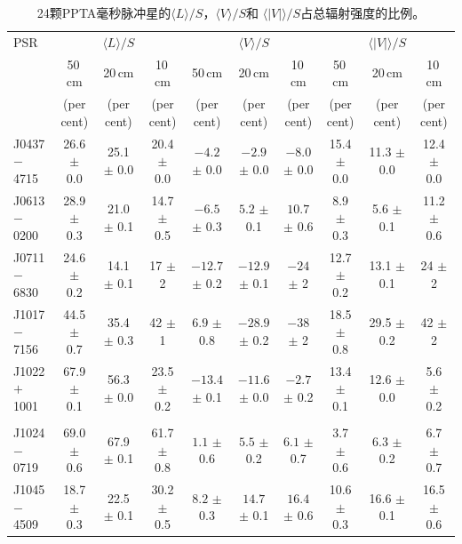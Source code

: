 %
\begin{landscape}
\begin{table}
\small
\begin{center}
\caption{24颗PPTA毫秒脉冲星的$\langle L \rangle/S$，$\langle V \rangle/S$和 
$\langle|V|\rangle/S$占总辐射强度的比例。}
\label{tablePol}
\begin{tabular}{lccccccccc}
\hline
PSR              &                  &    $\langle L \rangle/S$    &                  &               & $\langle V \rangle/S$       &                  &      &      $\langle|V|\rangle/S$       &                      \\
								 &    50\,cm      &   20\,cm       &    10\,cm &    50\,cm      &   20\,cm       &    10\,cm &    50\,cm      &   20\,cm       &    10\,cm              \\
								 &     (per cent)   &         (per cent)          &     (per cent)   &    (per cent)   &         (per cent)          &     (per cent)   &   (per cent)   &         (per cent)          &     (per cent)  \\
\hline
J0437$-$4715& 26.6 $\pm$ 0.0& 25.1 $\pm $ 0.0& 20.4 $\pm$ 0.0&$ -4.2$ $\pm$ 0.0 &$ -2.9$ $\pm$ 0.0 &$ -8.0$ $\pm$ 0.0 & 15.4 $\pm$ 0.0 & 11.3 $\pm$ 0.0 & 12.4 $\pm$ 0.0 \\
J0613$-$0200& 28.9 $\pm$ 0.3& 21.0 $\pm $ 0.1& 14.7 $\pm$ 0.5&$ -6.5$ $\pm$ 0.3 &$ 5.2 $ $\pm$ 0.1 &$ 10.7$ $\pm$ 0.6 &  8.9 $\pm$ 0.3 &  5.6 $\pm$ 0.1 & 11.2 $\pm$ 0.6 \\
J0711$-$6830& 24.6 $\pm$ 0.2& 14.1 $\pm $ 0.1& 17   $\pm$ 2  &$-12.7$ $\pm$ 0.2 &$-12.9$ $\pm$ 0.1 &$ -24 $ $\pm$ 2   & 12.7 $\pm$ 0.2 & 13.1 $\pm$ 0.1 & 24   $\pm$ 2 \\
J1017$-$7156& 44.5 $\pm$ 0.7& 35.4 $\pm $ 0.3& 42   $\pm$ 1  &$  6.9$ $\pm$ 0.8 &$-28.9$ $\pm$ 0.2 &$ -38 $ $\pm$ 2   & 18.5 $\pm$ 0.8 & 29.5 $\pm$ 0.2 & 42   $\pm$ 2 \\
J1022$+$1001& 67.9 $\pm$ 0.1& 56.3 $\pm $ 0.0& 23.5 $\pm$ 0.2&$-13.4$ $\pm$ 0.1 &$-11.6$ $\pm$ 0.0 &$ -2.7$ $\pm$ 0.2 & 13.4 $\pm$ 0.1 & 12.6 $\pm$ 0.0 & 5.6  $\pm$ 0.2 \\
            &               &                &               &                &                &                &                &                &                \\
J1024$-$0719& 69.0 $\pm$ 0.6& 67.9 $\pm $ 0.1& 61.7 $\pm$ 0.8&$ 1.1 $ $\pm$ 0.6 &$  5.5$ $\pm$ 0.2 &$ 6.1 $ $\pm$ 0.7 &  3.7 $\pm$ 0.6 &  6.3 $\pm$ 0.2 & 6.7  $\pm$ 0.7 \\
J1045$-$4509& 18.7 $\pm$ 0.3& 22.5 $\pm $ 0.1& 30.2 $\pm$ 0.5&$ 8.2 $ $\pm$ 0.3 &$ 14.7$ $\pm$ 0.1 &$ 16.4$ $\pm$ 0.6 & 10.6 $\pm$ 0.3 & 16.6 $\pm$ 0.1 & 16.5 $\pm$ 0.6 \\

\end{tabular}
\end{center}
\end{table}
\end{landscape}
